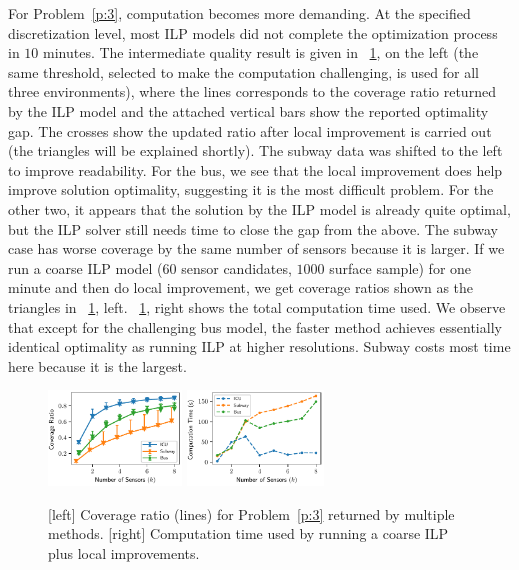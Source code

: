 For Problem~\ref{p:3}, computation becomes more demanding. At the specified 
discretization level, most ILP models did not complete the optimization process 
in $10$ minutes. The intermediate quality result is given in ~\ref{fig:computation-time-3}, on the left (the same threshold, selected to make the computation challenging, is used for all three environments), where the lines 
corresponds to the coverage ratio returned by the ILP model and the attached vertical bars show the reported optimality gap. The crosses show the updated ratio after local improvement is carried out (the triangles will be explained shortly). 
The subway data was shifted to the left to improve readability.
For the bus, we see that the local improvement does help improve solution optimality, suggesting it is the most difficult problem. For the other two, it appears that the solution by the ILP model is already quite optimal, but the ILP solver still needs time to close the gap from the above. The subway case has worse coverage by the same number of sensors because it is larger. If we run a coarse ILP model ($60$ sensor candidates, $1000$ surface sample) for one minute and then do local improvement, we get coverage ratios shown as the triangles in ~\ref{fig:computation-time-3}, left. ~\ref{fig:computation-time-3}, right shows the total computation time used. We observe that except for the challenging bus model, the faster method achieves essentially identical optimality as running ILP at higher resolutions. Subway costs most time here because it is the largest. 

\begin{figure}[!ht]
    \centering
    \includegraphics[width=.48\columnwidth, height=1in]{chapters/surf/fig/result-coverage-ratio-3-eps-converted-to.pdf}
    \includegraphics[width=.48\columnwidth, height=1in]{chapters/surf/fig/result-time-3-coarse-eps-converted-to.pdf}
    \caption{[left] Coverage ratio (lines) for Problem~\ref{p:3} returned by multiple methods. [right] Computation time used by running a coarse ILP plus local improvements.}
    \label{fig:computation-time-3}
\end{figure}

